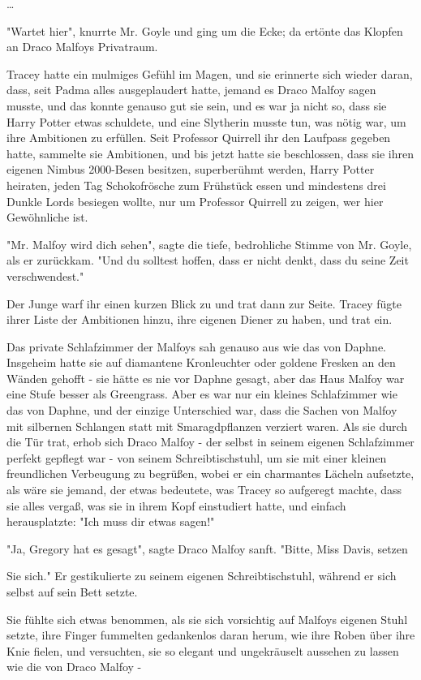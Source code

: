 {…

"Wartet hier", knurrte Mr. Goyle und ging um die Ecke; da ertönte das Klopfen an Draco Malfoys Privatraum.

Tracey hatte ein mulmiges Gefühl im Magen, und sie erinnerte sich wieder daran, dass, seit Padma alles ausgeplaudert hatte, jemand es Draco Malfoy sagen musste, und das konnte genauso gut sie sein, und es war ja nicht so, dass sie Harry Potter etwas schuldete, und eine Slytherin musste tun, was nötig war, um ihre Ambitionen zu erfüllen. Seit Professor Quirrell ihr den Laufpass gegeben hatte, sammelte sie Ambitionen, und bis jetzt hatte sie beschlossen, dass sie ihren eigenen Nimbus 2000-Besen besitzen, superberühmt werden, Harry Potter heiraten, jeden Tag Schokofrösche zum Frühstück essen und mindestens drei Dunkle Lords besiegen wollte, nur um Professor Quirrell zu zeigen, wer hier Gewöhnliche ist.

"Mr. Malfoy wird dich sehen", sagte die tiefe, bedrohliche Stimme von Mr. Goyle, als er zurückkam. "Und du solltest hoffen, dass er nicht denkt, dass du seine Zeit verschwendest."

Der Junge warf ihr einen kurzen Blick zu und trat dann zur Seite. Tracey fügte ihrer Liste der Ambitionen hinzu, ihre eigenen Diener zu haben, und trat ein.

Das private Schlafzimmer der Malfoys sah genauso aus wie das von Daphne. Insgeheim hatte sie auf diamantene Kronleuchter oder goldene Fresken an den Wänden gehofft - sie hätte es nie vor Daphne gesagt, aber das Haus Malfoy war eine Stufe besser als Greengrass. Aber es war nur ein kleines Schlafzimmer wie das von Daphne, und der einzige Unterschied war, dass die Sachen von Malfoy mit silbernen Schlangen statt mit Smaragdpflanzen verziert waren. Als sie durch die Tür trat, erhob sich Draco Malfoy - der selbst in seinem eigenen Schlafzimmer perfekt gepflegt war - von seinem Schreibtischstuhl, um sie mit einer kleinen freundlichen Verbeugung zu begrüßen, wobei er ein charmantes Lächeln aufsetzte, als wäre sie jemand, der etwas bedeutete, was Tracey so aufgeregt machte, dass sie alles vergaß, was sie in ihrem Kopf einstudiert hatte, und einfach herausplatzte: "Ich muss dir etwas sagen!"

"Ja, Gregory hat es gesagt", sagte Draco Malfoy sanft. "Bitte, Miss Davis, setzen

Sie sich." Er gestikulierte zu seinem eigenen Schreibtischstuhl, während er sich selbst auf sein Bett setzte.

Sie fühlte sich etwas benommen, als sie sich vorsichtig auf Malfoys eigenen Stuhl setzte, ihre Finger fummelten gedankenlos daran herum, wie ihre Roben über ihre Knie fielen, und versuchten, sie so elegant und ungekräuselt aussehen zu lassen wie die von Draco Malfoy -

}
